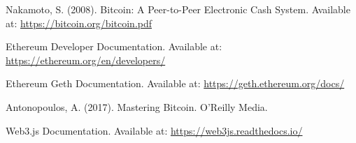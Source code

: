 \documentclass[11pt]{article}
\begin{document}
\clearpage

\begin{thebibliography}{9}
     Nakamoto, S. (2008). Bitcoin: A Peer-to-Peer Electronic Cash System. Available at: \url{https://bitcoin.org/bitcoin.pdf}
    
     Ethereum Developer Documentation. Available at: \url{https://ethereum.org/en/developers/}
    
     Ethereum Geth Documentation. Available at: \url{https://geth.ethereum.org/docs/}
    
     Antonopoulos, A. (2017). Mastering Bitcoin. O'Reilly Media.
    
     Web3.js Documentation. Available at: \url{https://web3js.readthedocs.io/}
\end{thebibliography}
\end{document}
